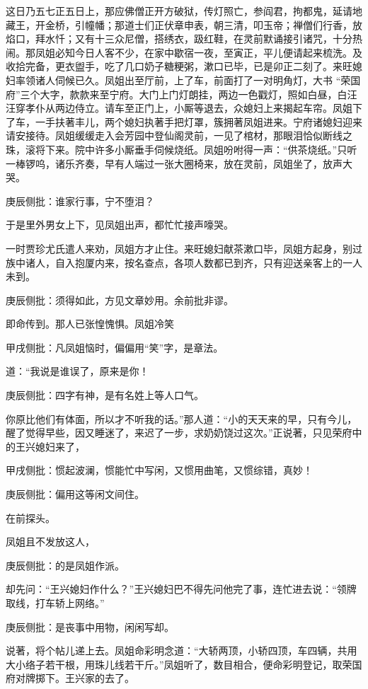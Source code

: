 \begin{parag}
    这日乃五七正五日上，那应佛僧正开方破狱，传灯照亡，参阎君，拘都鬼，延请地藏王，开金桥，引幢幡；那道士们正伏章申表，朝三清，叩玉帝；禅僧们行香，放焰口，拜水忏；又有十三众尼僧，搭绣衣，趿红鞋，在灵前默诵接引诸咒，十分热闹。那凤姐必知今日人客不少，在家中歇宿一夜，至寅正，平儿便请起来梳洗。及收拾完备，更衣盥手，吃了几口奶子糖粳粥，漱口已毕，已是卯正二刻了。来旺媳妇率领诸人伺候已久。凤姐出至厅前，上了车，前面打了一对明角灯，大书 “荣国府”三个大字，款款来至宁府。大门上门灯朗挂，两边一色戳灯，照如白昼，白汪汪穿孝仆从两边侍立。请车至正门上，小厮等退去，众媳妇上来揭起车帘。凤姐下了车，一手扶著丰儿，两个媳妇执著手把灯罩，簇拥著凤姐进来。宁府诸媳妇迎来请安接待。凤姐缓缓走入会芳园中登仙阁灵前，一见了棺材，那眼泪恰似断线之珠，滚将下来。院中许多小厮垂手伺候烧纸。凤姐吩咐得一声：“供茶烧纸。”只听一棒锣呜，诸乐齐奏，早有人端过一张大圈椅来，放在灵前，凤姐坐了，放声大哭。\begin{note}庚辰侧批：谁家行事，宁不堕泪？\end{note}于是里外男女上下，见凤姐出声，都忙忙接声嚎哭。
\end{parag}


\begin{parag}
    一时贾珍尤氏遣人来劝，凤姐方才止住。来旺媳妇献茶漱口毕，凤姐方起身，别过族中诸人，自入抱厦内来，按名查点，各项人数都已到齐，只有迎送亲客上的一人未到。\begin{note}庚辰侧批：须得如此，方见文章妙用。余前批非谬。\end{note}即命传到。那人已张惶愧惧。凤姐冷笑\begin{note}甲戌侧批：凡凤姐恼时，偏偏用“笑”字，是章法。\end{note}道：“我说是谁误了，原来是你！\begin{note}庚辰侧批：四字有神，是有名姓上等人口气。\end{note}你原比他们有体面，所以才不听我的话。”那人道：“小的天天来的早，只有今儿，醒了觉得早些，因又睡迷了，来迟了一步，求奶奶饶过这次。”正说著，只见荣府中的王兴媳妇来了，\begin{note}甲戌侧批：惯起波澜，惯能忙中写闲，又惯用曲笔，又惯综错，真妙！\end{note}\begin{note}庚辰侧批：偏用这等闲文间住。\end{note}在前探头。
\end{parag}


\begin{parag}
    凤姐且不发放这人，\begin{note}庚辰侧批：的是凤姐作派。\end{note}却先问：“王兴媳妇作什么？”王兴媳妇巴不得先问他完了事，连忙进去说：“领牌取线，打车轿上网络。”\begin{note}庚辰侧批：是丧事中用物，闲闲写却。\end{note}说著，将个帖儿递上去。凤姐命彩明念道：“大轿两顶，小轿四顶，车四辆，共用大小络子若干根，用珠儿线若干斤。”凤姐听了，数目相合，便命彩明登记，取荣国府对牌掷下。王兴家的去了。
\end{parag}


